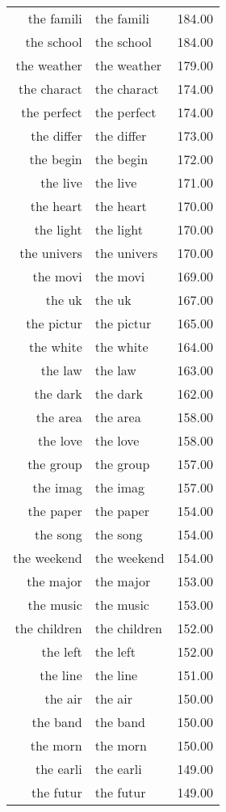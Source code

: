 \begin{table}[ht]
\begin{tabular}{rlr}
  the famili & the famili & 184.00 \\ 
  the school & the school & 184.00 \\ 
  the weather & the weather & 179.00 \\ 
  the charact & the charact & 174.00 \\ 
  the perfect & the perfect & 174.00 \\ 
  the differ & the differ & 173.00 \\ 
  the begin & the begin & 172.00 \\ 
  the live & the live & 171.00 \\ 
  the heart & the heart & 170.00 \\ 
  the light & the light & 170.00 \\ 
  the univers & the univers & 170.00 \\ 
  the movi & the movi & 169.00 \\ 
  the uk & the uk & 167.00 \\ 
  the pictur & the pictur & 165.00 \\ 
  the white & the white & 164.00 \\ 
  the law & the law & 163.00 \\ 
  the dark & the dark & 162.00 \\ 
  the area & the area & 158.00 \\ 
  the love & the love & 158.00 \\ 
  the group & the group & 157.00 \\ 
  the imag & the imag & 157.00 \\ 
  the paper & the paper & 154.00 \\ 
  the song & the song & 154.00 \\ 
  the weekend & the weekend & 154.00 \\ 
  the major & the major & 153.00 \\ 
  the music & the music & 153.00 \\ 
  the children & the children & 152.00 \\ 
  the left & the left & 152.00 \\ 
  the line & the line & 151.00 \\ 
  the air & the air & 150.00 \\ 
  the band & the band & 150.00 \\ 
  the morn & the morn & 150.00 \\ 
  the earli & the earli & 149.00 \\ 
  the futur & the futur & 149.00 \\ 

\end{tabular}
\end{table}
